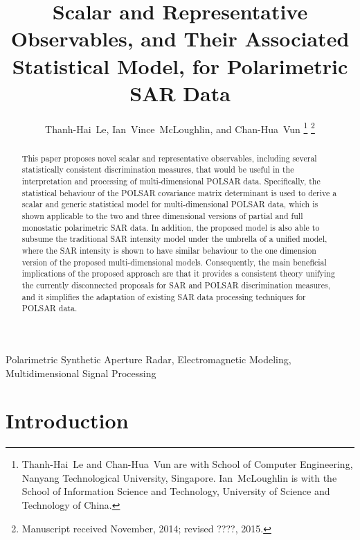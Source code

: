 \documentclass[journal]{IEEEtran}
\title{
  Scalar and Representative Observables, and Their Associated Statistical Model, for Polarimetric SAR Data
}
\author{Thanh-Hai~Le,
        Ian~Vince~McLoughlin, 
	and Chan-Hua~Vun%
\thanks{Thanh-Hai~Le and Chan-Hua~Vun are with School of Computer Engineering, 
Nanyang Technological University, Singapore. Ian~McLoughlin is with the School of Information Science and Technology,
University of Science and Technology of China.
}%
\thanks{Manuscript received November, 2014; revised ????, 2015.}}
\begin{document}
\maketitle

\begin{abstract}
This paper proposes novel scalar and representative observables, including several statistically consistent discrimination measures,
  that would be useful in the interpretation and processing of multi-dimensional POLSAR data.
Specifically, the statistical behaviour of the POLSAR covariance matrix determinant is used
  to derive a scalar and generic statistical model for multi-dimensional POLSAR data,
  which is shown applicable to the two and three dimensional versions of partial and full monostatic polarimetric SAR data.
In addition, the proposed model is also able to subsume the traditional SAR intensity model under the umbrella of a unified model,
  where the SAR intensity is shown to have similar behaviour to the one dimension version of the proposed multi-dimensional models.
Consequently, the main beneficial implications of the proposed approach are that
  it provides a consistent theory unifying the currently disconnected proposals for SAR and POLSAR discrimination measures,
  and it simplifies the adaptation of existing SAR data processing techniques for POLSAR data.
\end{abstract}

\begin{IEEEkeywords}
Polarimetric Synthetic Aperture Radar, Electromagnetic Modeling, Multidimensional Signal Processing  
\end{IEEEkeywords}

\IEEEpeerreviewmaketitle

\section{Introduction}
\end{document}

